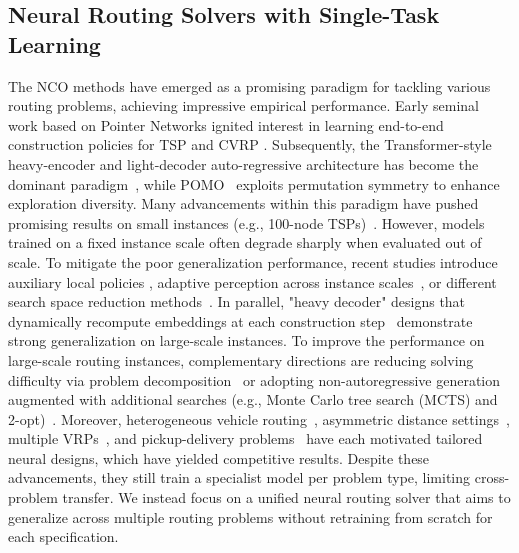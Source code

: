 \documentclass{article}
\theoremstyle{plain}
\theoremstyle{definition}
\theoremstyle{remark}
\begin{document}
\subsection{Neural Routing Solvers with Single-Task Learning}
The NCO methods have emerged as a promising paradigm for tackling various routing problems, achieving impressive empirical performance. Early seminal work based on Pointer Networks ignited interest in learning end-to-end construction policies for TSP and CVRP \citep{vinyals2015pointer,bello2016neural,nazari2018reinforcement}. Subsequently, the Transformer-style heavy-encoder and light-decoder auto-regressive architecture has become the dominant paradigm~\citep{kool2019attention}, while POMO~\citep{kwon2020pomo} exploits permutation symmetry to enhance exploration diversity. Many advancements within this paradigm have pushed promising results on small instances (e.g., 100-node TSPs)~\citep{xin2020stepwise,kim2022symnco,xiao2024reinforcement,xiao2023distilling,sun2024regret}. However, models trained on a fixed instance scale often degrade sharply when evaluated out of scale. To mitigate the poor generalization performance, recent studies introduce auxiliary local policies \citep{gao2023elg}, adaptive perception across instance scales~\citep{zhou2024icam}, or different search space reduction methods~\citep{fang2024invit,zhou2025L2R,chen2025projection}. In parallel, "heavy decoder" designs that dynamically recompute embeddings at each construction step~\citep{drakulic2023bq,luo2023lehd} demonstrate strong generalization on large-scale instances. To improve the performance on large-scale routing instances, complementary directions are reducing solving difficulty via problem decomposition~\citep{zheng2024udc,ye2023glop,li2025drhg} or adopting non-autoregressive generation augmented with additional searches (e.g., Monte Carlo tree search (MCTS) and 2-opt)~\citep{fu2021attgcn_mcts,sun2023difusco,qiu2022dimes,li2024T2T,ye2023deepaco}. Moreover, heterogeneous vehicle routing~\citep{li2022hcvrp}, asymmetric distance settings~\citep{kwon2021matnet}, multiple VRPs~\citep{zheng2024dpn}, and pickup-delivery problems~\citep{li2021pdtsp,kong2024efficientpdp} have each motivated tailored neural designs, which have yielded competitive results. Despite these advancements, they still train a specialist model per problem type, limiting cross-problem transfer. We instead focus on a unified neural routing solver that aims to generalize across multiple routing problems without retraining from scratch for each specification. 
\end{document}
